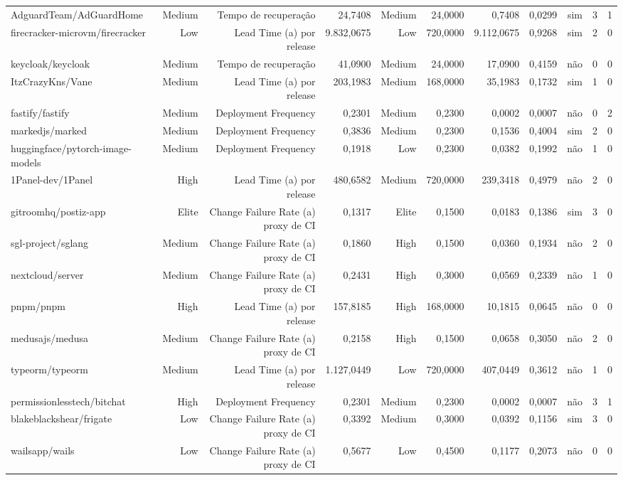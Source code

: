 \begin{tabular}{lrrrrrrrrrr}
AdguardTeam/AdGuardHome & Medium & Tempo de recuperação & 24,7408 & Medium & 24,0000 & 0,7408 & 0,0299 & sim & 3 & 1 \\
firecracker-microvm/firecracker & Low & Lead Time (a) por release & 9.832,0675 & Low & 720,0000 & 9.112,0675 & 0,9268 & sim & 2 & 0 \\
keycloak/keycloak & Medium & Tempo de recuperação & 41,0900 & Medium & 24,0000 & 17,0900 & 0,4159 & não & 0 & 0 \\
ItzCrazyKns/Vane & Medium & Lead Time (a) por release & 203,1983 & Medium & 168,0000 & 35,1983 & 0,1732 & sim & 1 & 0 \\
fastify/fastify & Medium & Deployment Frequency & 0,2301 & Medium & 0,2300 & 0,0002 & 0,0007 & não & 0 & 2 \\
markedjs/marked & Medium & Deployment Frequency & 0,3836 & Medium & 0,2300 & 0,1536 & 0,4004 & sim & 2 & 0 \\
huggingface/pytorch-image-models & Medium & Deployment Frequency & 0,1918 & Low & 0,2300 & 0,0382 & 0,1992 & não & 1 & 0 \\
1Panel-dev/1Panel & High & Lead Time (a) por release & 480,6582 & Medium & 720,0000 & 239,3418 & 0,4979 & não & 2 & 0 \\
gitroomhq/postiz-app & Elite & Change Failure Rate (a) proxy de CI & 0,1317 & Elite & 0,1500 & 0,0183 & 0,1386 & sim & 3 & 0 \\
sgl-project/sglang & Medium & Change Failure Rate (a) proxy de CI & 0,1860 & High & 0,1500 & 0,0360 & 0,1934 & não & 2 & 0 \\
nextcloud/server & Medium & Change Failure Rate (a) proxy de CI & 0,2431 & High & 0,3000 & 0,0569 & 0,2339 & não & 1 & 0 \\
pnpm/pnpm & High & Lead Time (a) por release & 157,8185 & High & 168,0000 & 10,1815 & 0,0645 & não & 0 & 0 \\
medusajs/medusa & Medium & Change Failure Rate (a) proxy de CI & 0,2158 & High & 0,1500 & 0,0658 & 0,3050 & não & 2 & 0 \\
typeorm/typeorm & Medium & Lead Time (a) por release & 1.127,0449 & Low & 720,0000 & 407,0449 & 0,3612 & não & 1 & 0 \\
permissionlesstech/bitchat & High & Deployment Frequency & 0,2301 & Medium & 0,2300 & 0,0002 & 0,0007 & não & 3 & 1 \\
blakeblackshear/frigate & Low & Change Failure Rate (a) proxy de CI & 0,3392 & Medium & 0,3000 & 0,0392 & 0,1156 & sim & 3 & 0 \\
wailsapp/wails & Low & Change Failure Rate (a) proxy de CI & 0,5677 & Low & 0,4500 & 0,1177 & 0,2073 & não & 0 & 0 \\

\end{tabular}

